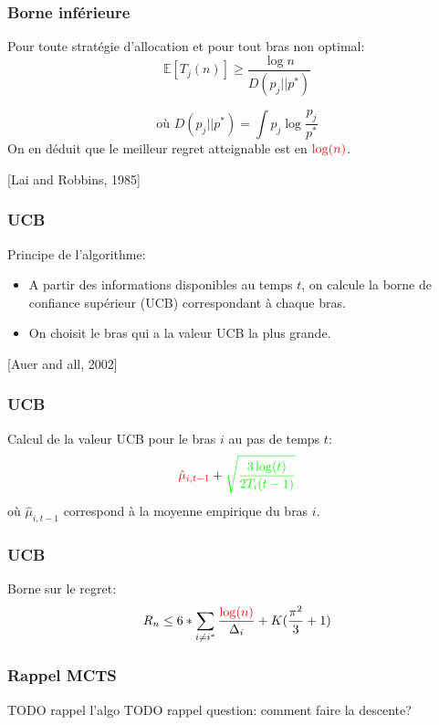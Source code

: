 \documentclass[compress, color = usenames, dvipsnames]{beamer}
\begin{document}
\begin{frame}
    \frametitle{Borne inférieure}


    Pour toute stratégie d'allocation et pour tout bras non optimal:
    $$\mathbb{E} [T_j(n)] \ge \frac{\log n}{D(p_j || p^*)}$$

    $$\mbox{où }D(p_j || p^*) = \int p_j \log \frac{p_j}{p^*}$$
    On en déduit que le meilleur regret atteignable est en ${\color{red} \log(n)}$.

    \hfill [Lai and Robbins, 1985]

\end{frame}



\begin{frame}
    \frametitle{UCB}
    Principe de l'algorithme:
    \begin{itemize}
        \item A partir des informations disponibles au temps $t$, on calcule la borne de confiance supérieur (UCB) correspondant à chaque bras.
        \item On choisit le bras qui a la valeur UCB la plus grande.
    \end{itemize}
    \hfill [Auer and all, 2002]
\end{frame}

\begin{frame}
    \frametitle{UCB}
    Calcul de la valeur UCB pour le bras $i$ au pas de temps $t$:
    $$ {\color{red} \hat{\mu}_{i,t-1}} + {\color{green} \sqrt{\frac{3\log(t)}{2T_i(t-1)}}} $$
    où $\hat{\mu}_{i,t-1} $ correspond à la moyenne empirique du bras $i$.
    
\end{frame}

\begin{frame}
    \frametitle{UCB}
    Borne sur le regret:
    $$ R_n \le 6*\sum_{i \ne i^*}\frac{\color{red}\log(n)}{\Delta_i} + K(\frac{\pi^2}{3}+1) $$
    
\end{frame}



\begin{frame}
    \frametitle{Rappel MCTS}

    TODO rappel l'algo
    TODO rappel question: comment faire la descente?


\end{frame}
\end{document}

